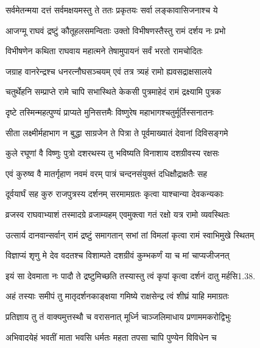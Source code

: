 \twolineshloka
{सर्वमेतन्मया दत्तं सर्वमक्षयमस्तु ते}
{ततः प्रकृतयः सर्वा लङ्कावासिजनाश्च ये}%

\twolineshloka
{आजग्मू राघवं द्रष्टुं कौतूहलसमन्विताः}
{उक्तो विभीषणस्तैस्तु रामं दर्शय नः प्रभो}%

\twolineshloka
{विभीषणेन कथिता राघवाय महात्मने}
{तेषामुपायनं सर्वं भरतो रामचोदितः}%

\twolineshloka
{जग्राह वानरेन्द्रश्च धनरत्नौघसञ्चयम्}
{एवं तत्र त्र्यहं रामो ह्यवसद्राक्षसालये}%

\twolineshloka
{चतुर्थेहनि सम्प्राप्ते रामे चापि सभास्थिते}
{केकसी पुत्रमाहेदं रामं द्रक्ष्यामि पुत्रक}%

\twolineshloka
{दृष्टे तस्मिन्महत्पुण्यं प्राप्यते मुनिसत्तमैः}
{विष्णुरेष महाभागश्चतुर्मूर्तिस्सनातनः}%

\twolineshloka
{सीता लक्ष्मीर्महाभाग न बुद्धा साग्रजेन ते}
{पित्रा ते पूर्वमाख्यातं देवानां दिविसङ्गमे}%

\twolineshloka
{कुले रघूणां वै विष्णुः पुत्रो दशरथस्य तु}
{भविष्यति विनाशाय दशग्रीवस्य रक्षसः}%


\twolineshloka
{एवं कुरुष्व वै मातर्गृहाण नवमं वरम्}
{पात्रं चन्दनसंयुक्तं दधिक्षौद्राक्षतैः सह}%

\twolineshloka
{दूर्वयार्घं सह कुरु राजपुत्रस्य दर्शनम्}
{सरमामग्रतः कृत्वा याश्चान्या देवकन्यकाः}%

\twolineshloka
{व्रजस्व राघवाभ्याशं तस्मादग्रे व्रजाम्यहम्}
{एवमुक्त्वा गतं रक्षो यत्र रामो व्यवस्थितः}%

\twolineshloka
{उत्सार्य दानवान्सर्वान् रामं द्रष्टुं समागतान्}
{सभां तां विमलां कृत्वा रामं स्वाभिमुखे स्थितम्}%


\twolineshloka
{विज्ञाप्यं शृणु मे देव वदतश्च विशाम्पते}
{दशग्रीवं कुम्भकर्णं या च मां चाप्यजीजनत्}%

\twolineshloka
{इयं सा देवमाता नः पादौ ते द्रष्टुमिच्छति}
{तस्यास्तु त्वं कृपां कृत्वा दर्शनं दातु मर्हसि1.38.}%


\twolineshloka
{अहं तस्याः समीपं तु मातृदर्शनकाङ्क्षया}
{गमिष्ये राक्षसेन्द्र त्वं शीघ्रं याहि ममाग्रतः}%

\twolineshloka
{प्रतिज्ञाय तु तं वाक्यमुत्तस्थौ च वरासनात्}
{मूर्ध्नि चाञ्जलिमाधाय प्रणाममकरोद्विभुः}%

\twolineshloka
{अभिवादयेहं भवतीं माता भवसि धर्मतः}
{महता तपसा चापि पुण्येन विविधेन च}%

